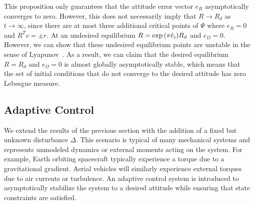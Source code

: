 \documentclass[letterpaper, 10 pt, conference]{ieeeconf}  %
\begin{document}
This proposition only guarantees that the attitude error vector \( e_R \) asymptotically converges to zero.
However, this does not necessarily imply that \( R \to R_d \) as \( t \to \infty \), since there are at most three additional critical points of \( \Psi \) where \( e_R = 0 \) and \( R^T v = \pm r \).
At an undesired equilibrium \( R = \exp{ \ensuremath{\left( \pi \hat{e}_i \right)}} R_d \) and \( e_\Omega =0 \).
However, we can show that these undesired equilibrium points are unstable in the sense of Lyapunov~\cite{LeeITCST13}.
As a result, we can claim that the desired equilibrium \( R = R_d \text{ and } e_\Omega = 0 \) is almost globally asymptotically stable, which means that the set of initial conditions that do not converge to the desired attitude has zero Lebesgue measure.
 
\subsection{Adaptive Control}
We extend the results of the previous section with the addition of a fixed but unknown disturbance \( \Delta \).
This scenario is typical of many mechanical systems and represents unmodeled dynamics or external moments acting on the system.
For example, Earth orbiting spacecraft typically experience a torque due to a gravitational gradient.
Aerial vehicles will similarly experience external torques due to air currents or turbulence.
An adaptive control system is introduced to asymptotically stabilize the system to a desired attitude while ensuring that state constraints are satisfied. %
\end{document}
